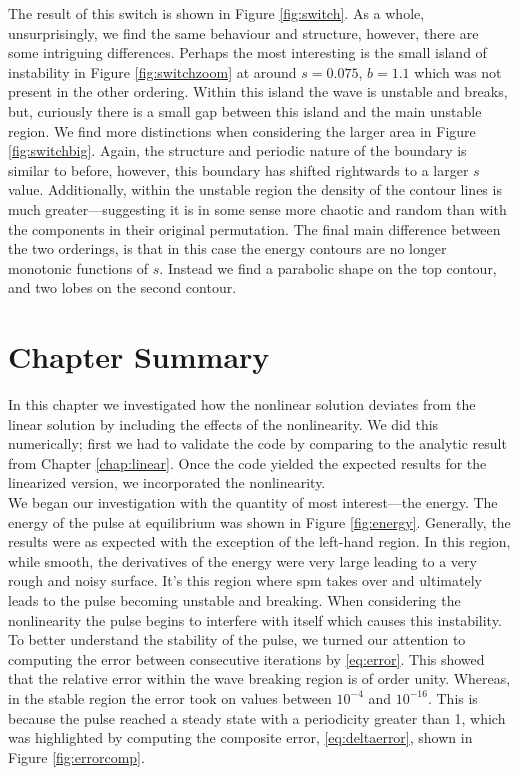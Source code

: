 The result of this switch is shown in Figure \ref{fig:switch}. As a whole, unsurprisingly, we find the same behaviour and structure, however, there are some intriguing differences. Perhaps the most interesting is the small island of instability in Figure \ref{fig:switchzoom} at around $s = 0.075$, $b = 1.1$ which was not present in the other ordering. Within this island the wave is unstable and breaks, but, curiously there is a small gap between this island and the main unstable region. We find more distinctions when considering the larger area in Figure \ref{fig:switchbig}. Again, the structure and periodic nature of the boundary is similar to before, however, this boundary has shifted rightwards to a larger $s$ value. Additionally, within the unstable region the density of the contour lines is much greater---suggesting it is in some sense more chaotic and random than with the components in their original permutation. The final main difference between the two orderings, is that in this case the energy contours are no longer monotonic functions of $s$. Instead we find a parabolic shape on the top contour, and two lobes on the second contour. \\

\section{Chapter Summary}
In this chapter we investigated how the nonlinear solution deviates from the linear solution by including the effects of the nonlinearity. We did this numerically; first we had to validate the code by comparing to the analytic result from Chapter \ref{chap:linear}. Once the code yielded the expected results for the linearized version, we incorporated the nonlinearity. \\

We began our investigation with the quantity of most interest---the energy. The energy of the pulse at equilibrium was shown in Figure \ref{fig:energy}. Generally, the results were as expected with the exception of the left-hand region. In this region, while smooth, the derivatives of the energy were very large leading to a very rough and noisy surface. It's this region where \gls{spm} takes over and ultimately leads to the pulse becoming unstable and breaking. When considering the nonlinearity the pulse begins to interfere with itself which causes this instability. \\

To better understand the stability of the pulse, we turned our attention to computing the error between consecutive iterations by \eqref{eq:error}. This showed that the relative error within the wave breaking region is of order unity. Whereas, in the stable region the error took on values between $10^{-4}$ and $10^{-16}$. This is because the pulse reached a steady state with a periodicity greater than 1, which was highlighted by computing the composite error, \eqref{eq:deltaerror}, shown in Figure \ref{fig:errorcomp}. \\

